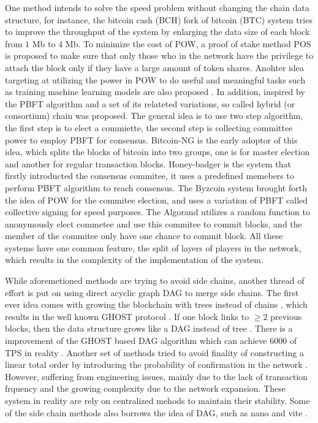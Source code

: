 One method intends to solve the speed problem without changing the chain data structure, for instance, 
the bitcoin cash (BCH) fork of bitcoin (BTC) system tries to improve the throughput of the system by enlarging the data size of each block from $1$ Mb to $4$ Mb. 
To minimize the cost of POW, a proof of stake method POS \cite{wood2014ethereum} is proposed to make sure that only those who in the network have the privilege to attach the block only if they have a large amount of token shares.
Anohter idea targeting at utilizing the power in POW to do useful and meaningful tasks such as training machine learning models are also proposed \cite{matthew2017aion}.
In addition, inspired by the PBFT algorithm \cite{castro1999practical} and a set of its relateted variations, so called hybrid (or consortium) chain was proposed. 
The general idea is to use two step algorithm, the first step is to elect a commiette, the second step is collecting committee power to employ PBFT for consensus.
Bitcoin-NG \cite{eyal2016bitcoin} is the early adoptor of this idea, which splits the blocks of bitcoin into two groups, one is for master election and another for regular transaction blocks. 
Honey-badger \cite{miller2016honey} is the system that firstly introducted the consensus commitee, it uses a predefined memebers to perform PBFT algorithm to reach consensus.  
The Byzcoin system \cite{kogias2016enhancing} brought forth the idea of POW for the commitee election, and uses a variation of PBFT called collective signing for speed purposes.
The Algorand \cite{gilad2017algorand} utilizes a random function to anonymously elect commetee and use this commitee to commit blocks, and the member of the commitee only have one chance to commit block.
All these systems have one common feature, the split of layers of players in the network, which results in the complexity of the implementation of the system.

While aforemetioned methods are trying to avoid side chains, another thread of effort is put on using direct acyclic graph DAG to merge side chains.
The first ever idea comes with growing the blockchain with trees instead of chains \cite{sompolinsky2013accelerating}, which results in the well known GHOST protocol \cite{sompolinsky2015secure}.
If one block links to $\geq 2$ previous blocks, then the data structure grows like a DAG instead of tree \cite{sompolinsky2016spectre, sompolinskyphantom, lewenberg2015inclusive}.
There is a improvement of the GHOST based DAG algorithm which can achieve $6000$ of TPS in reality \cite{li2018scaling}.
Another set of methods tried to avoid finality of constructing a linear total order by introducing the probability of confirmation in the network \cite{popov2016tangle, churyumov2016byteball}. 
However, suffering from engineering issues, mainly due to the lack of transaction frquency and the growing complexity due to the network expansion.
These system in reality are rely on centralized mehods to maintain their stability.
Some of the side chain methods also borrows the idea of DAG, such as nano \cite{lemahieu2018nano} and vite \cite{liuvite}.

